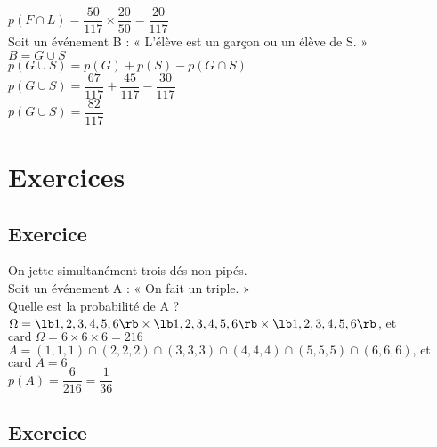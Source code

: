 
$p\left(F\cap L\right) = \dfrac{50}{117} \times \dfrac{20}{50} = \dfrac{20}{117} $\\

Soit un événement B : « L'élève est un garçon ou un élève de S. » \\

$ B = G\cup S$ \\

$p\left(G\cup S\right) = p\left(G\right) + p\left(S\right) - p\left(G\cap S\right) $ \\

$p\left(G\cup S\right) = \dfrac{67}{117} + \dfrac{45}{117} - \dfrac{30}{117} $ \\

$p\left(G\cup S\right) = \dfrac{82}{117} $ \\

\newpage

\section{Exercices}

\subsection{Exercice }

On jette simultanément trois dés non-pipés. \\ 

Soit un événement A : « On fait un triple. » \\

Quelle est la probabilité de A ? \\

$\Omega = \lb 1,2,3,4,5,6 \rb \times \lb 1,2,3,4,5,6 \rb \times \lb 1,2,3,4,5,6 \rb $, et $\mathrm{card} \; \Omega = 6 \times 6 \times 6 = 216 $ \\

$ A = \left(1,1,1\right) \cap \left(2,2,2\right) \cap \left(3,3,3\right)\cap \left(4,4,4\right)\cap \left(5,5,5\right)\cap \left(6,6,6\right) $, et $\mathrm{card} \; A = 6 $ \\

$p\left(A\right) = \dfrac{6}{216} = \dfrac{1}{36} $ 

\subsection{Exercice }

